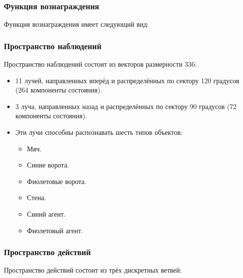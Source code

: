 \documentclass[11pt,a4paper]{article}
\begin{document}
\subsubsection{Функция вознаграждения}\label{the-reward-function}

Функция вознаграждения имеет следующий вид:


\subsubsection{Пространство наблюдений}\label{the-observation-space}

Пространство наблюдений состоит из векторов размерности 336:

\begin{itemize}
\tightlist
\item
  11 лучей, направленных вперёд и распределённых по сектору 120 градусов (264 компоненты состояния).
\item
  3 луча, направленных назад и распределённых по сектору 90 градусов (72 компоненты состояния).
\item
  Эти лучи способны распознавать шесть типов объектов:

  \begin{itemize}
  \tightlist
  \item
    Мяч.
  \item
    Синие ворота.
  \item
    Фиолетовые ворота.
  \item
    Стена.
  \item
    Синий агент.
  \item
    Фиолетовый агент.
  \end{itemize}
\end{itemize}

\subsubsection{Пространство действий}\label{the-action-space}

Пространство действий состоит из трёх дискретных ветвей:

\end{document}
